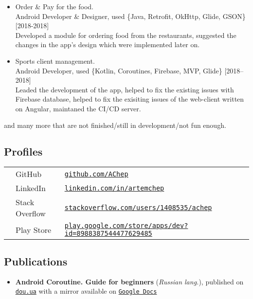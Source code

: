 \documentclass[a4paper]{article}
\begin{document}
\begin{itemize}
		\item \faAndroid \enskip Order \& Pay for the food. \\[0.2em]
		{\footnotesize Android Developer \& Designer, used \{Java, Retrofit, OkHttp, Glide, GSON\} \hfill [2018-2018]} \\[0.2em]
		Developed a module for ordering food from the restaurants, suggested the changes in the app's design which were implemented later on. 
		
		\item \faAndroid \enskip Sports client management. \\[0.2em]
		{\footnotesize Android Developer, used \{Kotlin, Coroutines, Firebase, MVP, Glide\} \hfill [2018--2018]} \\[0.2em]
		Leaded the development of the app, helped to fix the existing issues with Firebase database, helped to fix the exisiting issues of the web-client written on Angular, maintaned the CI/CD server.

	\end{itemize}
	and many more that are not finished/still in development/not fun enough.
	
	\subsection*{Profiles}
	\begin{tabular}{@{}lll}
		\faGithub & GitHub & \href{https://github.com/AChep}{\texttt{github.com/AChep}} \\
		\faLinkedin & LinkedIn & \href{https://www.linkedin.com/in/artemchep/}{\texttt{linkedin.com/in/artemchep}} \\
		\faStackOverflow & Stack Overflow & \href{https://stackoverflow.com/users/1408535/achep}{\texttt{stackoverflow.com/users/1408535/achep}} \\
		\faPlay & Play Store & \href{https://play.google.com/store/apps/dev?id=8988387544477629485}{\texttt{play.google.com/store/apps/dev?id=8988387544477629485}} \\
	\end{tabular}
	
	\subsection*{Publications}
	\begin{itemize}
		\item \textbf{Android Coroutine. Guide for beginners} (\textit{Russian lang.}), published on \href{https://dou.ua/forums/topic/33173/}{\texttt{dou.ua}} with a mirror available on \href{https://docs.google.com/document/d/1PtQ5UjAo0gpSBVRP7VUO1cWeLKR4_pi1KOihPlNiB18}{\texttt{Google Docs}}
	\end{itemize}
\end{document}

